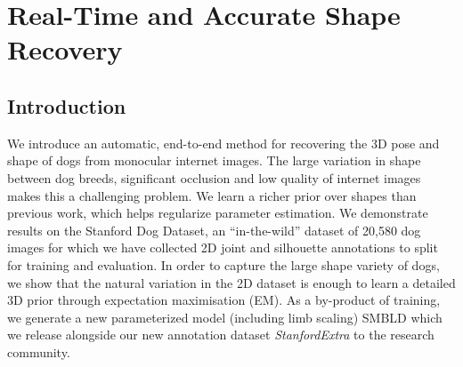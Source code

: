 \chapter{Real-Time and Accurate Shape Recovery}

\ifpdf
    \graphicspath{{Chapter5/Figs/Raster/}{Chapter5/Figs/PDF/}{Chapter5/Figs/}}
\else
    \graphicspath{{Chapter5/Figs/Vector/}{Chapter5/Figs/}}
\fi





\section{Introduction}
We introduce an automatic, end-to-end method for recovering the 3D pose and shape of dogs from monocular internet images. 
The large variation in shape between dog breeds, significant occlusion and low quality of internet images makes this a challenging problem.
We learn a richer prior over shapes than previous work, which helps regularize parameter estimation.
We demonstrate results on the Stanford Dog Dataset, an ``in-the-wild'' dataset of 20,580 dog images for which we have collected 2D joint and silhouette annotations to split for training and evaluation. 
In order to capture the large shape variety of dogs, we show that the natural variation in the 2D dataset is enough to learn a detailed 3D prior through expectation maximisation (EM).
As a by-product of training, we generate a new parameterized model (including limb scaling) SMBLD which we release alongside our new annotation dataset \emph{StanfordExtra} to the research community.


